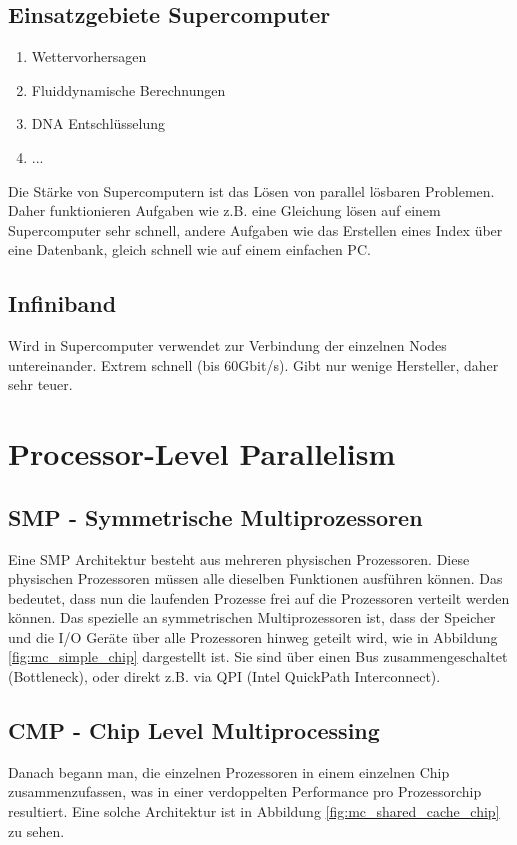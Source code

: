 \subsection{Einsatzgebiete Supercomputer}
\begin{enumerate}
	\item Wettervorhersagen
	\item Fluiddynamische Berechnungen
	\item DNA Entschlüsselung
	\item ...
\end{enumerate}
Die Stärke von Supercomputern ist das Lösen von parallel lösbaren Problemen. Daher funktionieren Aufgaben wie z.B. eine Gleichung lösen auf einem Supercomputer sehr schnell, andere Aufgaben wie das Erstellen eines Index über eine Datenbank, gleich schnell wie auf einem einfachen PC.

\subsection{Infiniband}
Wird in Supercomputer verwendet zur Verbindung der einzelnen Nodes untereinander. Extrem schnell (bis 60Gbit/s). Gibt nur wenige Hersteller, daher sehr teuer.

\section{Processor-Level Parallelism}

\subsection{SMP - Symmetrische Multiprozessoren}
Eine SMP Architektur besteht aus mehreren physischen Prozessoren. Diese physischen Prozessoren müssen alle dieselben Funktionen ausführen können. Das bedeutet, dass nun die laufenden Prozesse frei auf die Prozessoren verteilt werden können.
Das spezielle an symmetrischen Multiprozessoren ist, dass der Speicher und die I/O Geräte über alle Prozessoren hinweg geteilt wird, wie in Abbildung \ref{fig:mc_simple_chip} dargestellt ist. Sie sind über einen Bus zusammengeschaltet (Bottleneck), oder direkt z.B. via QPI (Intel QuickPath Interconnect). 

\subsection{CMP - Chip Level Multiprocessing}
Danach begann man, die einzelnen Prozessoren in einem einzelnen Chip zusammenzufassen, was in einer verdoppelten Performance pro Prozessorchip resultiert. Eine solche Architektur ist in Abbildung \ref{fig:mc_shared_cache_chip} zu sehen. 

